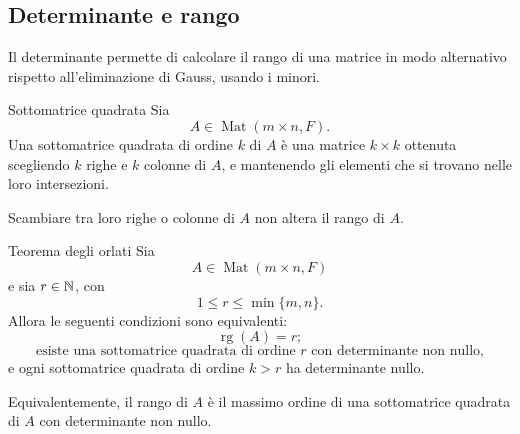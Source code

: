 \documentclass[a4paper]{article}
\begin{document}
\subsection{Determinante e rango}

Il determinante permette di calcolare il rango di una matrice in modo alternativo rispetto all'eliminazione di Gauss, usando i minori.

\begin{snippetdefinition}{Sottomatrice quadrata}
    Sia
    \[
        A\in\operatorname{Mat}(m\times n,F).
    \]
    Una sottomatrice quadrata di ordine \(k\) di \(A\) è una matrice \(k\times k\) ottenuta scegliendo \(k\) righe e \(k\) colonne di \(A\), e mantenendo gli elementi che si trovano nelle loro intersezioni.
\end{snippetdefinition}

\begin{snippetremark}{}
    Scambiare tra loro righe o colonne di \(A\) non altera il rango di \(A\).
\end{snippetremark}

\begin{snippettheorem}{Teorema degli orlati}
    Sia
    \[
        A\in\operatorname{Mat}(m\times n,F)
    \]
    e sia \(r\in\mathbb{N}\), con
    \[
        1\leq r\leq \min\{m,n\}.
    \]
    Allora le seguenti condizioni sono equivalenti:
    \[
        \operatorname{rg}(A)=r;
    \]
    \[
        \text{esiste una sottomatrice quadrata di ordine \(r\) con determinante non nullo,}
    \]
    e ogni sottomatrice quadrata di ordine \(k>r\) ha determinante nullo.

    Equivalentemente, il rango di \(A\) è il massimo ordine di una sottomatrice quadrata di \(A\) con determinante non nullo.
\end{snippettheorem}
\end{document}
